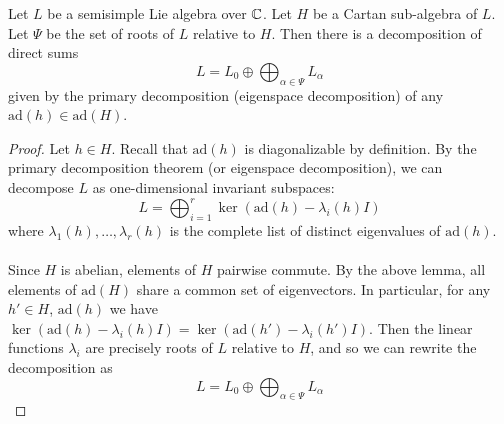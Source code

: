 \documentclass[a4paper]{article}
\begin{document}
\begin{lmm}{}{} Let $L$ be a semisimple Lie algebra over $\mathbb{C}$. Let $H$ be a Cartan sub-algebra of $L$. Let $\Psi$ be the set of roots of $L$ relative to $H$. Then there is a decomposition of direct sums $$L=L_0\oplus\bigoplus_{\alpha\in\Psi}L_\alpha$$ given by the primary decomposition (eigenspace decomposition) of any $\text{ad}(h)\in\text{ad}(H)$. \tcbline
\begin{proof}
Let $h\in H$. Recall that $\text{ad}(h)$ is diagonalizable by definition. By the primary decomposition theorem (or eigenspace decomposition), we can decompose $L$ as one-dimensional invariant subspaces: $$L=\bigoplus_{i=1}^r\ker(\text{ad}(h)-\lambda_i(h)I)$$ where $\lambda_1(h),\dots,\lambda_r(h)$ is the complete list of distinct eigenvalues of $\text{ad}(h)$. \\~\\

Since $H$ is abelian, elements of $H$ pairwise commute. By the above lemma, all elements of $\text{ad}(H)$ share a common set of eigenvectors. In particular, for any $h'\in H$, $\text{ad}(h)$ we have $\ker(\text{ad}(h)-\lambda_i(h)I)=\ker(\text{ad}(h')-\lambda_i(h')I)$. Then the linear functions $\lambda_i$ are precisely roots of $L$ relative to $H$, and so we can rewrite the decomposition as $$L=L_0\oplus\bigoplus_{\alpha\in\Psi}L_\alpha$$
\end{proof}
\end{lmm}
\end{document}
